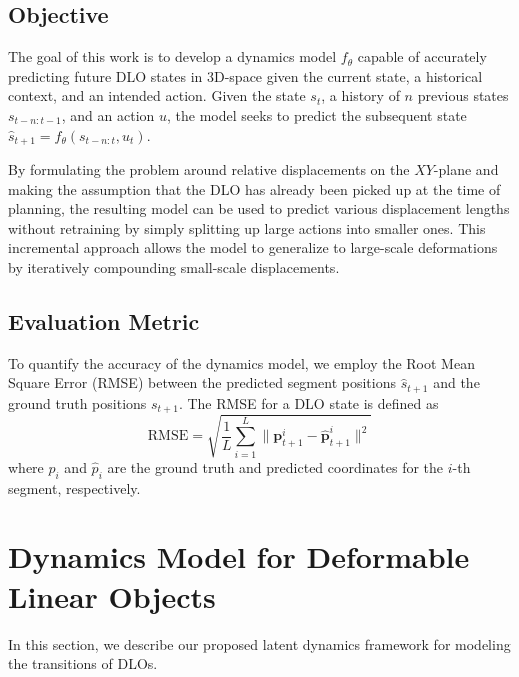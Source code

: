 \documentclass[letterpaper, 10 pt, conference]{ieeeconf}  %
\begin{document}
\subsection{Objective}
The goal of this work is to develop a dynamics model $f_\theta$ capable of accurately predicting future DLO states in 3D-space given the current state, a historical context, and an intended action. Given the state $s_t$, a history of $n$ previous states $s_{t-n:t-1}$, and an action $u$, the model seeks to predict the subsequent state $\hat{s}_{t+1} = f_\theta(s_{t-n:t}, u_t)$.

By formulating the problem around relative displacements on the $XY$-plane and making the assumption that the DLO has already been picked up at the time of planning, the resulting model can be used to predict various displacement lengths without retraining by simply splitting up large actions into smaller ones. This incremental approach allows the model to generalize to large-scale deformations by iteratively compounding small-scale displacements.

\subsection{Evaluation Metric}
To quantify the accuracy of the dynamics model, we employ the Root Mean Square Error (RMSE) between the predicted segment positions $\hat{s}_{t+1}$ and the ground truth positions $s_{t+1}$. The RMSE for a DLO state is defined as
\begin{equation*}
    \text{RMSE} = \sqrt{\frac{1}{L} \sum_{i=1}^{L} \|\mathbf{p}^i_{t+1} - \hat{\mathbf{p}}^i_{t+1}\|^2}
\end{equation*}
where $p_{i}$ and $\hat{p}_{i}$ are the ground truth and predicted coordinates for the $i$-th segment, respectively.





\section{Dynamics Model for Deformable Linear Objects} 
\label{sec:method}

In this section, we describe our proposed latent dynamics framework for modeling the transitions of DLOs.
\end{document}
